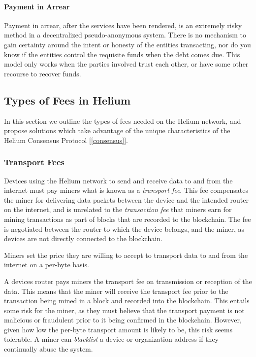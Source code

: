 \documentclass[10pt, nonatbib, nocopyrightspace, reprint]{sigplanconf}
\newcommand{\secref}[1]{[\autoref{#1}]}
\begin{document}
\paragraph{Payment in Arrear}
Payment in arrear, after the services have been rendered, is an extremely risky method in a decentralized pseudo-anonymous system. There is no mechanism to gain certainty around the intent or honesty of the entities transacting, nor do you know if the entities control the requisite funds when the debt comes due. This model only works when the parties involved trust each other, or have some other recourse to recover funds.

\subsection{Types of Fees in Helium}

In this section we outline the types of fees needed on the Helium network, and propose solutions which take advantage of the unique characteristics of the Helium Consensus Protocol \secref{consensus}.

\subsubsection{Transport Fees}

Devices using the Helium network to send and receive data to and from the internet must pay miners what is known as a \emph{transport fee}. This fee compensates the miner for delivering data packets between the device and the intended router on the internet, and is unrelated to the \emph{transaction fee} that miners earn for mining transactions as part of blocks that are recorded to the blockchain. The fee is negotiated between the router to which the device belongs, and the miner, as devices are not directly connected to the blockchain.

Miners set the price they are willing to accept to transport data to and from the internet on a per-byte basis. 

A devices router pays miners the transport fee on transmission or reception of the data. This means that the miner will receive the transport fee prior to the transaction being mined in a block and recorded into the blockchain. This entails some risk for the miner, as they must believe that the transport payment is not malicious or fraudulent prior to it being confirmed in the blockchain. However, given how low the per-byte transport amount is likely to be, this risk seems tolerable. A miner can \emph{blacklist} a device or organization address if they continually abuse the system.
\end{document}
